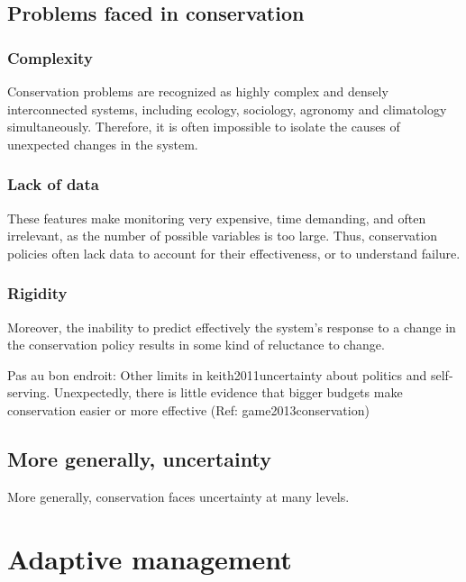 \documentclass[12pt,a4paper]{article}
\begin{document}
\subsection{Problems faced in conservation}

\subsubsection{Complexity}
Conservation problems are recognized as highly complex and densely interconnected systems, including ecology, sociology, agronomy and climatology simultaneously.
Therefore, it is often impossible to isolate the causes of unexpected changes in the system.

\subsubsection{Lack of data}
These features make monitoring very expensive, time demanding, and often irrelevant, as the number of possible variables is too large.
Thus, conservation policies often lack data to account for their effectiveness, or to understand failure.

\subsubsection{Rigidity}
Moreover, the inability to predict effectively the system's response to a change in the conservation policy results in some kind of reluctance to change.

Pas au bon endroit: Other limits in keith2011uncertainty about politics and self-serving.
Unexpectedly, there is little  evidence that bigger budgets make conservation easier or more effective (Ref: game2013conservation)

\subsection{More generally, uncertainty}
More generally, conservation faces uncertainty at many levels.

\section{Adaptive management}
\end{document}
